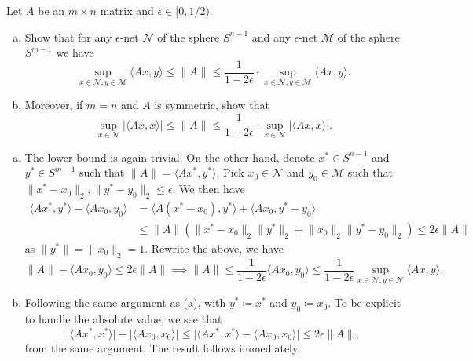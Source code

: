 \begin{problem*}[Exercise 4.4.3]\label{ex4.4.3}
	Let \(A\) be an \(m \times n\) matrix and \(\epsilon \in [0, 1 / 2)\).
	\begin{enumerate}[(a)]
		\item\label{ex4.4.3:a} Show that for any \(\epsilon \)-net \(\mathcal{N} \) of the sphere \(S^{n-1}\) and any \(\epsilon \)-net \(\mathcal{M} \) of the sphere \(S^{m-1}\) we have
		      \[
			      \sup _{x \in \mathcal{N} , y \in \mathcal{M} }\langle Ax, y \rangle
			      \leq \lVert A \rVert
			      \leq \frac{1}{1 - 2\epsilon } \cdot \sup _{x \in \mathcal{N} , y \in \mathcal{M} } \langle Ax, y \rangle .
		      \]
		\item\label{ex4.4.3:b} Moreover, if \(m = n\) and \(A\) is symmetric, show that
		      \[
			      \sup _{x \in \mathcal{N} } \lvert \langle Ax, x \rangle \rvert
			      \leq \lVert A \rVert
			      \leq \frac{1}{1 - 2\epsilon } \cdot \sup _{x \in \mathcal{N} } \lvert \langle Ax, x \rangle \rvert .
		      \]
	\end{enumerate}
\end{problem*}
\begin{answer}
	\begin{enumerate}[(a)]
		\item The lower bound is again trivial. On the other hand, denote \(x^{\ast} \in S^{n-1}\) and \(y^{\ast} \in S^{m-1}\) such that \(\lVert A \rVert = \langle A x^{\ast} , y^{\ast}  \rangle \). Pick \(x_0 \in \mathcal{N} \) and \(y_0 \in \mathcal{M} \) such that \(\lVert x^{\ast} - x_0 \rVert _2, \lVert y^{\ast} - y_0 \rVert _2 \leq \epsilon \). We then have
		      \[
			      \begin{split}
				      \langle A x^{\ast} , y^{\ast}  \rangle - \langle A x_0, y_0 \rangle
				       & = \langle A(x^{\ast} - x_0), y^{\ast}  \rangle + \langle A x_0, y^{\ast} - y_0 \rangle                                                  \\
				       & \leq \lVert A \rVert (\lVert x^{\ast} - x_0 \rVert _2 \lVert y^{\ast} \rVert _2 + \lVert x_0 \rVert _2 \lVert y^{\ast} - y_0 \rVert _2)
				      \leq 2 \epsilon \lVert A \rVert
			      \end{split}
		      \]
		      as \(\lVert y^{\ast} \rVert = \lVert x_0 \rVert _2 = 1\). Rewrite the above, we have
		      \[
			      \lVert A \rVert - \langle A x_0, y_0 \rangle \leq 2 \epsilon \lVert A \rVert
			      \implies \lVert A \rVert \leq \frac{1}{1 - 2\epsilon} \langle A x_0, y_0 \rangle
			      \leq \frac{1}{1 - 2\epsilon} \sup _{x \in \mathcal{N} , y \in \mathcal{N} }\langle A x, y \rangle .
		      \]
		\item Following the same argument as \hyperref[ex4.4.3:a]{(a)}, with \(y^{\ast} \coloneqq x^{\ast} \) and \(y_0 \coloneqq x_0\). To be explicit to handle the absolute value, we see that
		      \[
			      \lvert \langle A x^{\ast} , x^{\ast} \rangle  \rvert - \lvert \langle A x_0, x_0 \rangle \rvert
			      \leq \lvert \langle A x^{\ast} , x^{\ast} \rangle - \langle A x_0, x_0 \rangle \rvert
			      \leq 2 \epsilon \lVert A \rVert ,
		      \]
		      from the same argument. The result follows immediately.
	\end{enumerate}
\end{answer}


